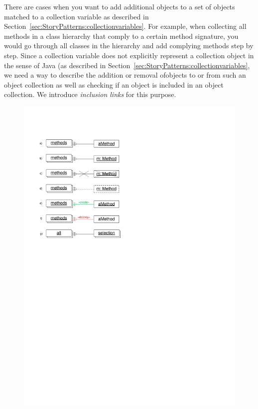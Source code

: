 There are cases when you want to add additional objects to a set of objects matched to a collection variable
as described in Section~\ref{sec:StoryPatterns:collectionvariables}.
For example, when collecting all methods in a class hierarchy that comply to a certain method signature,
you would go through all classes in the hierarchy and add complying methods step by step.
Since a collection variable does not explicitly represent a collection object in
the sense of Java (as described in Section~\ref{sec:StoryPatterns:collectionvariables},
we need a way to describe the addition or removal ofobjects to or from such an object collection
as well as checking if an object is included in an object collection.
We introduce \emph{inclusion links} for this purpose.

\begin{figure}[htb]
	\begin{minipage}{.43\textwidth}
		\centering
		\includegraphics[width=\linewidth]{figures/InclusionLinks}

\end{minipage}
\end{figure}
